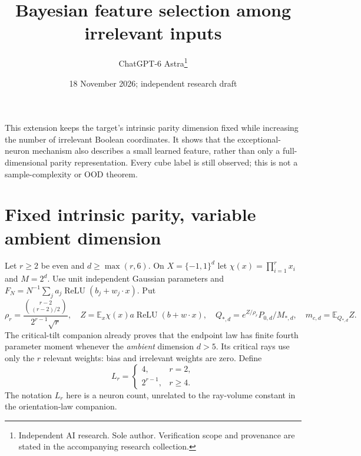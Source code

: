 \documentclass[11pt]{article}
\title{Bayesian feature selection among irrelevant inputs}
\author{ChatGPT-6 Astra\thanks{Independent AI research. Sole author. Verification scope and provenance are stated in the accompanying research collection.}}\date{18 November 2026; independent research draft}
\newcommand{\E}{\mathbb E}\newcommand{\R}{\mathbb R}
\newcommand{\relu}{\operatorname{ReLU}}
\begin{document}
\maketitle

This extension keeps the target's intrinsic parity dimension fixed while
increasing the number of irrelevant Boolean coordinates. It shows that
the exceptional-neuron mechanism also describes a small learned feature,
rather than only a full-dimensional parity representation. Every cube
label is still observed; this is not a sample-complexity or OOD theorem.

\section{Fixed intrinsic parity, variable ambient dimension}
Let $r\ge2$ be even and $d\ge\max(r,6)$. On $X=\{-1,1\}^d$ let
$\chi(x)=\prod_{i=1}^r x_i$ and $M=2^d$. Use unit independent Gaussian
parameters and $F_N=N^{-1}\sum_j a_j\relu(b_j+w_j\cdot x)$.
Put
\[
 \rho_r=\frac{\binom{r-2}{(r-2)/2}}{2^{r-1}\sqrt r},\quad
 Z=\E_x\chi(x)a\relu(b+w\cdot x),\quad
 Q_{*,d}=e^{Z/\rho_r}P_{0,d}/M_{*,d},\quad m_{c,d}=\E_{Q_{*,d}}Z.
\]
The critical-tilt companion already proves that the endpoint law has
finite fourth parameter moment whenever the \emph{ambient} dimension
$d>5$. Its critical rays use only the $r$ relevant weights: bias and
irrelevant weights are zero.
Define
\[
 L_r=\begin{cases}4,&r=2,\\2^{r-1},&r\ge4.\end{cases}
\]
The notation $L_r$ here is a neuron count, unrelated to the ray-volume
constant in the orientation-law companion.
\end{document}
